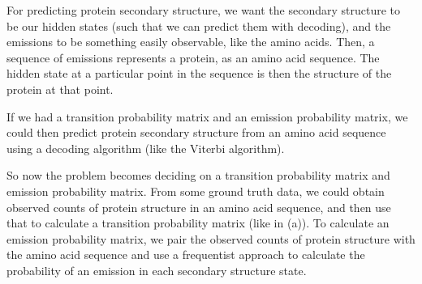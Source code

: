 \begin{enumerate}[label=(\alph*)]
    For predicting protein secondary structure, we want the secondary structure to be our hidden states (such that we can predict them with decoding), and the emissions to be something easily observable, like the amino acids. Then, a sequence of emissions represents a protein, as an amino acid sequence. The hidden state at a particular point in the sequence is then the structure of the protein at that point.

    If we had a transition probability matrix and an emission probability matrix, we could then predict protein secondary structure from an amino acid sequence using a decoding algorithm (like the Viterbi algorithm).

    So now the problem becomes deciding  on a transition probability matrix and emission probability matrix. From some ground truth data, we could obtain observed counts of protein structure in an amino acid sequence, and then use that to calculate a transition probability matrix (like in (a)). To calculate an emission probability matrix, we pair the observed counts of protein structure with the amino acid sequence and use a frequentist approach to calculate the probability of an emission in each secondary structure state.


        
\end{enumerate}

